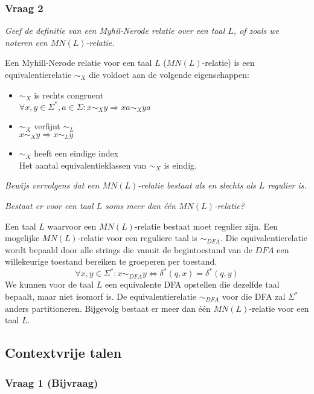 \subsubsection{Vraag 2}

\textit{Geef de definitie van een Myhil-Nerode relatie over een taal $L$, of zoals we noteren een $MN(L)$-relatie.}

Een Myhill-Nerode relatie voor een taal $L$ ($MN(L)$-relatie) is een equivalentierelatie $\sim_X$ die voldoet aan de volgende eigenschappen:
  \begin{itemize}
  \item $\sim_X$ is rechts congruent\\$\forall x, y \in \Sigma^*, a \in \Sigma: x \sim_X y \Rightarrow xa \sim_X ya$
  \item $\sim_X$ verfijnt $\sim_L$\\$x \sim_X y \Rightarrow x \sim_L y$
  \item $\sim_X$ heeft een eindige index\\Het aantal equivalentieklassen van $\sim_X$ is eindig.
  \end{itemize}

\textit{Bewijs vervolgens dat een $MN(L)$-relatie bestaat als en slechts als $L$ regulier is.}



\textit{Bestaat er voor een taal $L$ soms meer dan één $MN(L)$-relatie?}

Een taal $L$ waarvoor een $MN(L)$-relatie bestaat moet regulier zijn. Een mogelijke $MN(L)$-relatie voor een reguliere taal is $\sim_{DFA}$. Die equivalentierelatie wordt bepaald door alle strings die vanuit de begintoestand van de $DFA$ een willekeurige toestand bereiken te groeperen per toestand.
\begin{equation*}
\forall x, y \in \Sigma^*: x \sim_{DFA} y \Leftrightarrow \delta^*(q, x) = \delta^*(q, y)
\end{equation*}
We kunnen voor de taal $L$ een equivalente DFA opstellen die dezelfde taal bepaalt, maar niet isomorf is. De equivalentierelatie $\sim_{DFA}$ voor die DFA zal $\Sigma^*$ anders partitioneren. Bijgevolg bestaat er meer dan \'e\'en $MN(L)$-relatie voor een taal $L$.

\subsection{Contextvrije talen}

\subsubsection{Vraag 1 (Bijvraag)}

